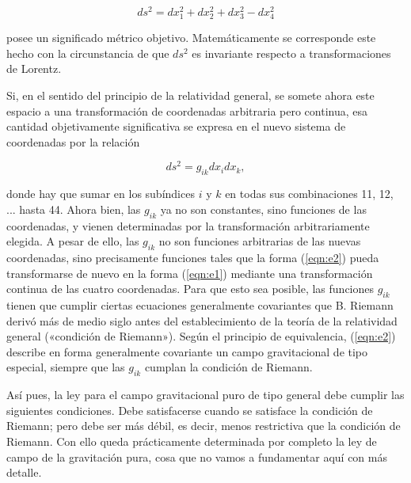 \documentclass[spanish]{book}
\begin{document}
\begin{equation}
ds^{2}=dx_{1}^{2}+dx_{2}^{2}+dx_{3}^{2}-dx_{4}^{2} \label{eqn:e1}
\end{equation}

\noindent posee un significado métrico objetivo. Matemáticamente se corresponde este hecho con la circunstancia de que $ds^{2}$ es invariante respecto a transformaciones de Lorentz.

Si, en el sentido del principio de la relatividad general, se somete ahora este
espacio a una transformación de coordenadas arbitraria pero continua, esa cantidad
objetivamente significativa se expresa en el nuevo sistema de coordenadas por la
relación

\begin{equation}
ds^{2}=g_{ik}dx_{i}dx_{k},\label{eqn:e2}
\end{equation}

\noindent donde hay que sumar en los subíndices $i$ y $k$ en todas sus combinaciones 11, 12, ...
hasta 44. Ahora bien, las $g_{ik}$ ya no son constantes, sino funciones de las coordenadas, y
vienen determinadas por la transformación arbitrariamente elegida. A pesar de ello, las
$g_{ik}$ no son funciones arbitrarias de las nuevas coordenadas, sino precisamente funciones
tales que la forma (\ref{eqn:e2}) pueda transformarse de nuevo en la forma (\ref{eqn:e1}) mediante una
transformación continua de las cuatro coordenadas. Para que esto sea posible, las
funciones $g_{ik}$ tienen que cumplir ciertas ecuaciones generalmente covariantes que B.
Riemann derivó más de medio siglo antes del establecimiento de la teoría de la
relatividad general («condición de Riemann»). Según el principio de equivalencia, (\ref{eqn:e2})
describe en forma generalmente covariante un campo gravitacional de tipo especial,
siempre que las $g_{ik}$ cumplan la condición de Riemann.

Así pues, la ley para el campo gravitacional puro de tipo general debe cumplir las
siguientes condiciones. Debe satisfacerse cuando se satisface la condición de
Riemann; pero debe ser más débil, es decir, menos restrictiva que la condición de
Riemann. Con ello queda prácticamente determinada por completo la ley de campo
de la gravitación pura, cosa que no vamos a fundamentar aquí con más detalle.
\end{document}
